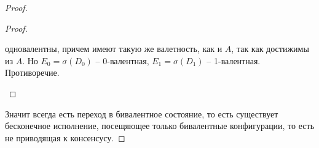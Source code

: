 \begin{proof}
\begin{proof}
\begin{itemize}
\begin{itemize}
                        одновалентны, причем имеют такую же валетность, как и $A$,
                        так как достижимы из $A$. Но $E_0 = \sigma(D_0)$ -- 0-валентная,
                        $E_1 = \sigma(D_1)$ -- 1-валентная. Противоречие.
                \end{itemize}
        \end{itemize}
    \end{proof}
    Значит всегда есть переход в бивалентное состояние, то есть существует бесконечное исполнение,
    посещяющее только бивалентные конфигурации, то есть не приводящая к консенсусу.
\end{proof}

